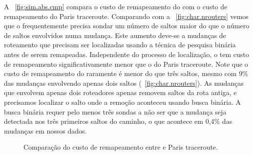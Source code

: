 A \figstr~\ref{fig:sim.abs.cmp} compara o custo de remapeamento do
\rmprt{} com o custo de remapeamento do Paris traceroute.  Comparando
com a \figstr~\ref{fig:char.nrouters} vemos que o \rmprt{}
frequentemente precisa sondar um número de saltos maior do que o número
de saltos envolvidos numa mudança.  Este aumento deve-se a mudanças de
roteamento que precisam ser localizadas usando a técnica de pesquisa
binária antes de serem remapeadas.  Independente do processo de
localização, o \rmprt{} tem custo de remapeamento significativamente
menor que o do Paris traceroute.  Note que o custo de remapeamento do
\rmprt{} raramente é menor do que três saltos, mesmo com 9\% das
mudanças envolvendo apenas dois saltos
(\figstr~\ref{fig:char.nrouters}).  As mudanças que envolvem apenas dois
roteadores apenas removem saltos da rota antiga, e precisamos localizar
o salto onde a remoção aconteceu usando busca binária.  A busca binária
requer pelo menos três sondas a não ser que a mudança seja detectada nos
três primeiros saltos do caminho, o que acontece em 0,4\% das mudanças
em nossos dados.

\begin{figure}
\begin{center}
\hspace{2mm}
\caption{Comparação do custo de remapeamento entre \rmprt{} e Paris
traceroute.}
\end{center}
\end{figure}

